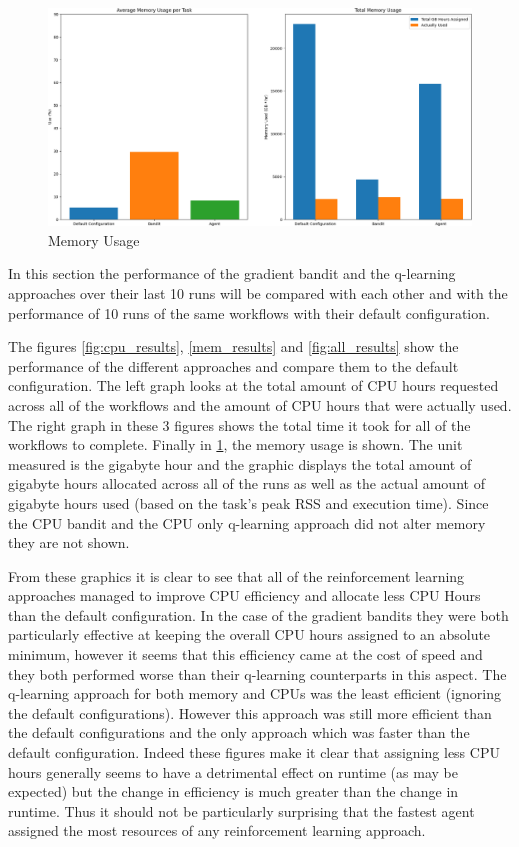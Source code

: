 \begin{figure}
    \centering
        \includegraphics[width=\textwidth]{fig/cropped_memory_usage_final.png}
        \caption{Memory Usage}
        \label{fig:mem_use}
\end{figure}

In this section the performance of the gradient bandit and the q-learning approaches over their last 10 runs will be compared with each other and with the performance of 10 runs of the same workflows with their default configuration.

The figures \ref{fig:cpu_results}, \ref{mem_results} and \ref{fig:all_results} show the performance of the different approaches and compare them to the default configuration. The left graph looks at the total amount of CPU hours requested across all of the workflows and the amount of CPU hours that were actually used. The right graph in these 3 figures shows the total time it took for all of the workflows to complete. Finally in \ref{fig:mem_use}, the memory usage is shown. The unit measured is the gigabyte hour and the graphic displays the total amount of gigabyte hours allocated across all of the runs as well as the actual amount of gigabyte hours used (based on the task’s peak RSS and execution time). Since the CPU bandit and the CPU only q-learning approach did not alter memory they are not shown.

From these graphics it is clear to see that all of the reinforcement learning approaches managed to improve CPU efficiency and allocate less CPU Hours than the default configuration. In the case of the gradient bandits they were both particularly effective at keeping the overall CPU hours assigned to an absolute minimum, however it seems that this efficiency came at the cost of speed and they both performed worse than their q-learning counterparts in this aspect. The q-learning approach for both memory and CPUs was the least efficient (ignoring the default configurations). However this approach was still more efficient than the default configurations and the only approach which was faster than the default configuration. Indeed these figures make it clear that assigning less CPU hours generally seems to have a detrimental effect on runtime (as may be expected) but the change in efficiency is much greater than the change in runtime. Thus it should not be particularly surprising that the fastest agent assigned the most resources of any reinforcement learning approach. 

